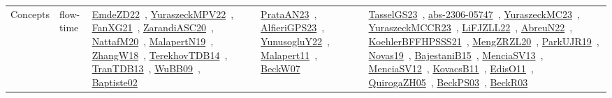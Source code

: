 {\begin{longtable}{lp{3cm}>{\raggedright\arraybackslash}p{6cm}>{\raggedright\arraybackslash}p{6cm}>{\raggedright\arraybackslash}p{8cm}}
Concepts & flow-time & \href{works/EmdeZD22.pdf}{EmdeZD22}~\cite{EmdeZD22}, \href{works/YuraszeckMPV22.pdf}{YuraszeckMPV22}~\cite{YuraszeckMPV22}, \href{works/FanXG21.pdf}{FanXG21}~\cite{FanXG21}, \href{works/ZarandiASC20.pdf}{ZarandiASC20}~\cite{ZarandiASC20}, \href{works/NattafM20.pdf}{NattafM20}~\cite{NattafM20}, \href{works/MalapertN19.pdf}{MalapertN19}~\cite{MalapertN19}, \href{works/ZhangW18.pdf}{ZhangW18}~\cite{ZhangW18}, \href{works/TerekhovTDB14.pdf}{TerekhovTDB14}~\cite{TerekhovTDB14}, \href{works/TranTDB13.pdf}{TranTDB13}~\cite{TranTDB13}, \href{works/WuBB09.pdf}{WuBB09}~\cite{WuBB09}, \href{works/Baptiste02.pdf}{Baptiste02}~\cite{Baptiste02} & \href{works/PrataAN23.pdf}{PrataAN23}~\cite{PrataAN23}, \href{works/AlfieriGPS23.pdf}{AlfieriGPS23}~\cite{AlfieriGPS23}, \href{works/YunusogluY22.pdf}{YunusogluY22}~\cite{YunusogluY22}, \href{works/Malapert11.pdf}{Malapert11}~\cite{Malapert11}, \href{works/BeckW07.pdf}{BeckW07}~\cite{BeckW07} & \href{works/TasselGS23.pdf}{TasselGS23}~\cite{TasselGS23}, \href{works/abs-2306-05747.pdf}{abs-2306-05747}~\cite{abs-2306-05747}, \href{works/YuraszeckMC23.pdf}{YuraszeckMC23}~\cite{YuraszeckMC23}, \href{works/YuraszeckMCCR23.pdf}{YuraszeckMCCR23}~\cite{YuraszeckMCCR23}, \href{works/LiFJZLL22.pdf}{LiFJZLL22}~\cite{LiFJZLL22}, \href{works/AbreuN22.pdf}{AbreuN22}~\cite{AbreuN22}, \href{works/KoehlerBFFHPSSS21.pdf}{KoehlerBFFHPSSS21}~\cite{KoehlerBFFHPSSS21}, \href{works/MengZRZL20.pdf}{MengZRZL20}~\cite{MengZRZL20}, \href{works/ParkUJR19.pdf}{ParkUJR19}~\cite{ParkUJR19}, \href{works/Novas19.pdf}{Novas19}~\cite{Novas19}, \href{works/BajestaniB15.pdf}{BajestaniB15}~\cite{BajestaniB15}, \href{works/MenciaSV13.pdf}{MenciaSV13}~\cite{MenciaSV13}, \href{works/MenciaSV12.pdf}{MenciaSV12}~\cite{MenciaSV12}, \href{works/KovacsB11.pdf}{KovacsB11}~\cite{KovacsB11}, \href{works/EdisO11.pdf}{EdisO11}~\cite{EdisO11}, \href{works/QuirogaZH05.pdf}{QuirogaZH05}~\cite{QuirogaZH05}, \href{works/BeckPS03.pdf}{BeckPS03}~\cite{BeckPS03}, \href{works/BeckR03.pdf}{BeckR03}~\cite{BeckR03}\\

\end{longtable}}

